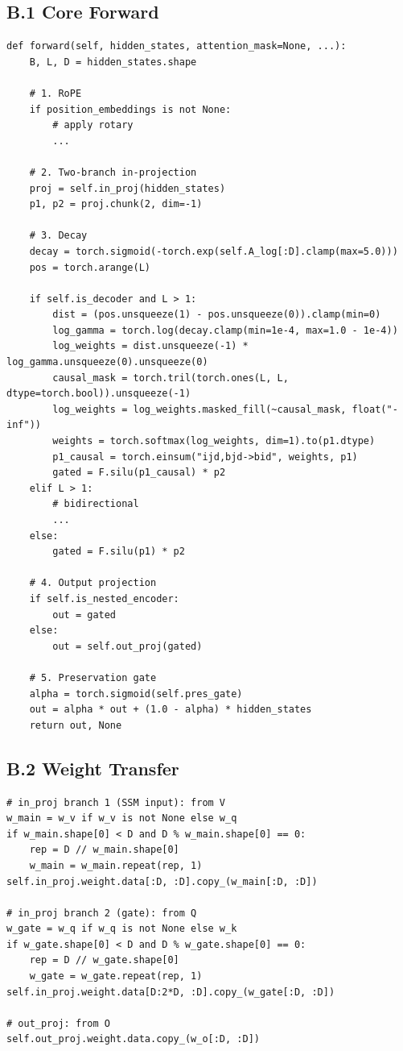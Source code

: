 \subsection{B.1 Core Forward}

\begin{lstlisting}
def forward(self, hidden_states, attention_mask=None, ...):
    B, L, D = hidden_states.shape
    
    # 1. RoPE
    if position_embeddings is not None:
        # apply rotary
        ...
    
    # 2. Two-branch in-projection
    proj = self.in_proj(hidden_states)
    p1, p2 = proj.chunk(2, dim=-1)
    
    # 3. Decay
    decay = torch.sigmoid(-torch.exp(self.A_log[:D].clamp(max=5.0)))
    pos = torch.arange(L)
    
    if self.is_decoder and L > 1:
        dist = (pos.unsqueeze(1) - pos.unsqueeze(0)).clamp(min=0)
        log_gamma = torch.log(decay.clamp(min=1e-4, max=1.0 - 1e-4))
        log_weights = dist.unsqueeze(-1) * log_gamma.unsqueeze(0).unsqueeze(0)
        causal_mask = torch.tril(torch.ones(L, L, dtype=torch.bool)).unsqueeze(-1)
        log_weights = log_weights.masked_fill(~causal_mask, float("-inf"))
        weights = torch.softmax(log_weights, dim=1).to(p1.dtype)
        p1_causal = torch.einsum("ijd,bjd->bid", weights, p1)
        gated = F.silu(p1_causal) * p2
    elif L > 1:
        # bidirectional
        ...
    else:
        gated = F.silu(p1) * p2
    
    # 4. Output projection
    if self.is_nested_encoder:
        out = gated
    else:
        out = self.out_proj(gated)
    
    # 5. Preservation gate
    alpha = torch.sigmoid(self.pres_gate)
    out = alpha * out + (1.0 - alpha) * hidden_states
    return out, None
\end{lstlisting}

\subsection{B.2 Weight Transfer}

\begin{lstlisting}
# in_proj branch 1 (SSM input): from V
w_main = w_v if w_v is not None else w_q
if w_main.shape[0] < D and D % w_main.shape[0] == 0:
    rep = D // w_main.shape[0]
    w_main = w_main.repeat(rep, 1)
self.in_proj.weight.data[:D, :D].copy_(w_main[:D, :D])

# in_proj branch 2 (gate): from Q
w_gate = w_q if w_q is not None else w_k
if w_gate.shape[0] < D and D % w_gate.shape[0] == 0:
    rep = D // w_gate.shape[0]
    w_gate = w_gate.repeat(rep, 1)
self.in_proj.weight.data[D:2*D, :D].copy_(w_gate[:D, :D])

# out_proj: from O
self.out_proj.weight.data.copy_(w_o[:D, :D])
\end{lstlisting}

